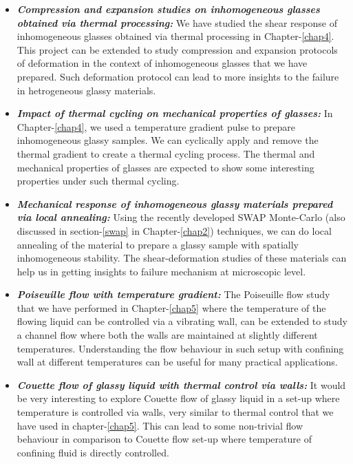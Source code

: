 \begin{itemize}
    \item {\bf \em Compression and expansion studies on inhomogeneous glasses obtained via thermal processing:} We have studied the shear response of inhomogeneous glasses obtained via thermal processing in Chapter-\ref{chap4}. This project can be extended to study compression and expansion protocols of deformation in the context of inhomogeneous glasses that we have prepared. Such deformation protocol can lead to more insights to the failure in hetrogeneous glassy materials.
    
    \item {\bf \em Impact of thermal cycling on mechanical properties of glasses:} In Chapter-\ref{chap4}, we used a temperature gradient pulse to prepare inhomogeneous glassy samples. We can cyclically apply and remove the thermal gradient to create a thermal cycling process. The thermal and mechanical properties of glasses are expected to show some interesting properties under such thermal cycling.
    
    \item {\bf \em Mechanical response of inhomogeneous glassy materials prepared via local annealing:} Using the recently developed SWAP Monte-Carlo (also discussed in section-\ref{swap} in Chapter-\ref{chap2}) techniques, we can do local annealing of the material to prepare a glassy sample with spatially inhomogeneous stability. The shear-deformation studies of these materials can help us in getting insights to failure mechanism at microscopic level.
    
    \item {\bf \em Poiseuille flow with temperature gradient: } The Poiseuille flow study that we have performed in Chapter-\ref{chap5} where the temperature of the flowing liquid can be controlled via a vibrating wall, can be extended to study a channel flow where both the walls are maintained at slightly different temperatures. Understanding the flow behaviour in such setup with confining wall at different temperatures can be useful for many practical applications.
    
    \item {\bf \em Couette flow of glassy liquid with thermal control via walls:} It would be very interesting to explore Couette flow of glassy liquid in a set-up where temperature is controlled via walls, very similar to thermal control that we have used in chapter-\ref{chap5}. This can lead to some non-trivial flow behaviour in comparison to Couette flow set-up where temperature of confining fluid is directly controlled.
    

\end{itemize}

